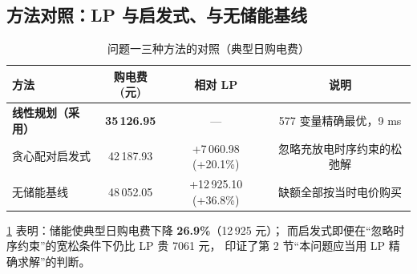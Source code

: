 \subsection{方法对照\nobreak：LP 与启发式\nobreak、与无储能基线}

\begin{table}[htbp]
\centering
\caption{问题一三种方法的对照（典型日购电费\nobreak）}
\label{tab:q1cmp}
\begin{tabular}{@{}lccc@{}}
\toprule
方法 & 购电费(元) & 相对 LP & 说明 \\
\midrule
\textbf{线性规划（采用\nobreak）} & \textbf{35\,126.95} & --- & 577 变量精确最优\nobreak，9 ms \\
贪心配对启发式 & 42\,187.93 & +7\,060.98 (+20.1\%) & 忽略充放电时序约束的松弛解 \\
无储能基线 & 48\,052.05 & +12\,925.10 (+36.8\%) & 缺额全部按当时电价购买 \\
\bottomrule
\end{tabular}
\end{table}

\cref{tab:q1cmp} 表明\nobreak：储能使典型日购电费下降 \textbf{26.9\%}（12\,925 元\nobreak）\nobreak；
而启发式即便在“忽略时序约束\nobreak”的宽松条件下仍比 LP 贵 7061 元\nobreak，
印证了第 2 节“本问题应当用 LP 精确求解\nobreak”的判断\nobreak。
